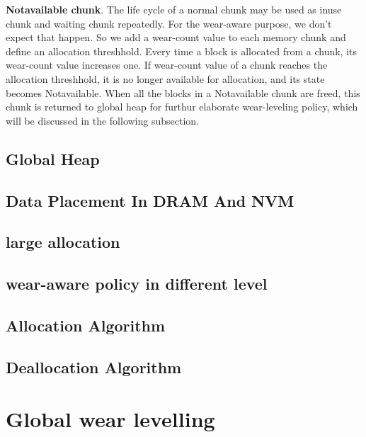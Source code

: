 \documentclass{vldb}
\begin{document}
\textbf{Notavailable chunk}. The life cycle of a normal chunk may be used as inuse chunk and waiting chunk repeatedly. 
For the wear-aware purpose, we don't expect that happen. 
So we add a wear-count value to each memory chunk and define an allocation threshhold. 
Every time a block is allocated from a chunk, its wear-count value increases one. 
If wear-count value of a chunk reaches the allocation threshhold, it is no longer available for allocation, and its state becomes Notavailable. 
When all the blocks in a Notavailable chunk are freed, this chunk is returned to global heap for furthur elaborate wear-leveling policy, which will be discussed in the following subsection.

\subsection{Global Heap}

\subsection{Data Placement In DRAM And NVM}


\subsection{large allocation}

\subsection{wear-aware policy in different level}


\subsection{Allocation Algorithm}

\subsection{Deallocation Algorithm}

\section{Global wear levelling}
\end{document}
